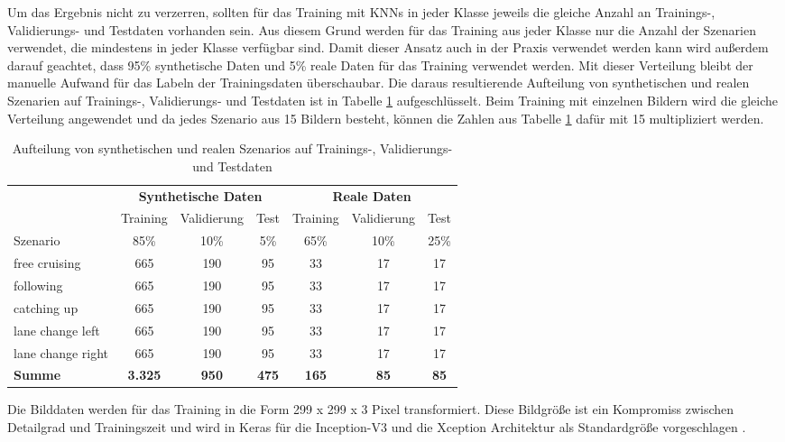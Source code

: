 Um das Ergebnis nicht zu verzerren, sollten für das Training mit \acp{KNN} in jeder Klasse jeweils die gleiche Anzahl an Trainings-, Validierungs- und Testdaten vorhanden sein. Aus diesem Grund werden für das Training aus jeder Klasse nur die Anzahl der Szenarien verwendet, die mindestens in jeder Klasse verfügbar sind. Damit dieser Ansatz auch in der Praxis verwendet werden kann wird außerdem darauf geachtet, dass 95\% synthetische Daten und 5\% reale Daten für das Training verwendet werden. Mit dieser Verteilung bleibt der manuelle Aufwand für das Labeln der Trainingsdaten überschaubar. Die daraus resultierende Aufteilung von synthetischen und realen Szenarien auf Trainings-, Validierungs- und Testdaten ist in Tabelle \ref{tab_daten_aufteilung} aufgeschlüsselt. Beim Training mit einzelnen Bildern wird die gleiche Verteilung angewendet und da jedes Szenario aus 15 Bildern besteht, können die Zahlen aus Tabelle \ref{tab_daten_aufteilung} dafür mit 15 multipliziert werden.

\begin{table}[h]
\centering
\def\arraystretch{1.4}
\begin{tabular}{l c c c c c c}

& \multicolumn{3}{c}{\textbf{Synthetische Daten}} & \multicolumn{3}{c}{\textbf{\textbf{Reale Daten}}} \\
& Training & Validierung & Test & Training & Validierung & Test \\
Szenario & 85\% & 10\% & 5\% & 65\% & 10\% & 25\% \\
\hline
free cruising & 665 & 190 & 95 & 33 & 17 & 17 \\
following & 665 & 190 & 95 & 33 & 17 & 17 \\
catching up & 665 & 190 & 95 & 33 & 17 & 17 \\
lane change left & 665 & 190 & 95 & 33 & 17 & 17 \\
lane change right & 665 & 190 & 95 & 33 & 17 & 17 \\
\hline
\textbf{Summe} & \textbf{3.325} & \textbf{950} & \textbf{475} & \textbf{165} & \textbf{85} & \textbf{85} \\
\hline

\end{tabular}
\caption{Aufteilung von synthetischen und realen Szenarios auf Trainings-, Validierungs- und Testdaten}
\label{tab_daten_aufteilung}
\end{table}

Die Bilddaten werden für das Training in die Form 299 x 299 x 3 Pixel transformiert. Diese Bildgröße ist ein Kompromiss zwischen Detailgrad und Trainingszeit und wird in Keras für die Inception-V3 und die Xception Architektur als Standardgröße vorgeschlagen \cite{chollet2015keras}.

